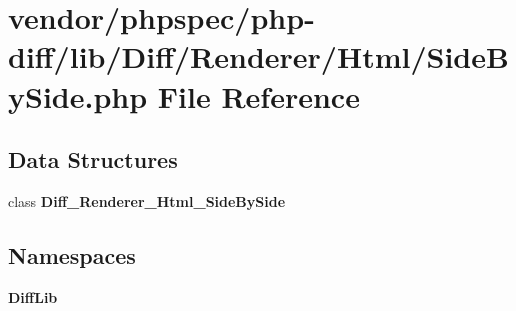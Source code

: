 \section{vendor/phpspec/php-\/diff/lib/\+Diff/\+Renderer/\+Html/\+Side\+By\+Side.php File Reference}
\label{_side_by_side_8php}
\subsection*{Data Structures}
\begin{DoxyCompactItemize}
\item 
class {\bf Diff\+\_\+\+Renderer\+\_\+\+Html\+\_\+\+Side\+By\+Side}
\end{DoxyCompactItemize}
\subsection*{Namespaces}
\begin{DoxyCompactItemize}
\item 
 {\bf Diff\+Lib}
\end{DoxyCompactItemize}
